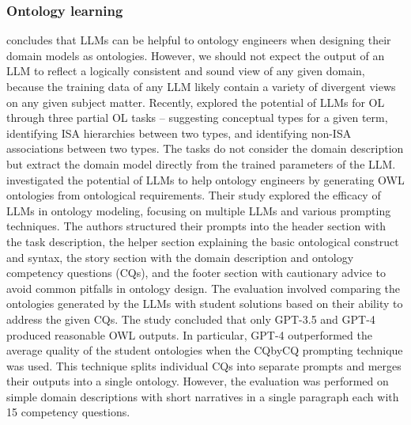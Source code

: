 \subsubsection{Ontology learning}

\citet{Neuhaus2023} concludes that LLMs can be helpful to ontology engineers when designing their domain models as ontologies. However, we should not expect the output of an LLM to reflect a logically consistent and sound view of any given domain, because the training data of any LLM likely contain a variety of divergent views on any given subject matter.
Recently, \citet{BabaeiGiglou2023} explored the potential of LLMs for OL through three partial OL tasks -- suggesting conceptual types for a given term, identifying ISA hierarchies between two types, and identifying non-ISA associations between two types. The tasks do not consider the domain description but extract the domain model directly from the trained parameters of the LLM.
\citet{Saeedizade2024} investigated the potential of LLMs to help ontology engineers by generating OWL ontologies from ontological requirements.
Their study explored the efficacy of LLMs in ontology modeling, focusing on multiple LLMs and various prompting techniques.
The authors structured their prompts into the header section with the task description, the helper section explaining the basic ontological construct and syntax, the story section with the domain description and ontology competency questions (CQs), and the footer section with cautionary advice to avoid common pitfalls in ontology design.
The evaluation involved comparing the ontologies generated by the LLMs with student solutions based on their ability to address the given CQs.
The study concluded that only GPT-3.5 and GPT-4 produced reasonable OWL outputs.
In particular, GPT-4 outperformed the average quality of the student ontologies when the CQbyCQ prompting technique was used.
This technique splits individual CQs into separate prompts and merges their outputs into a single ontology.
However, the evaluation was performed on simple domain descriptions with short narratives in a single paragraph each with 15 competency questions.
